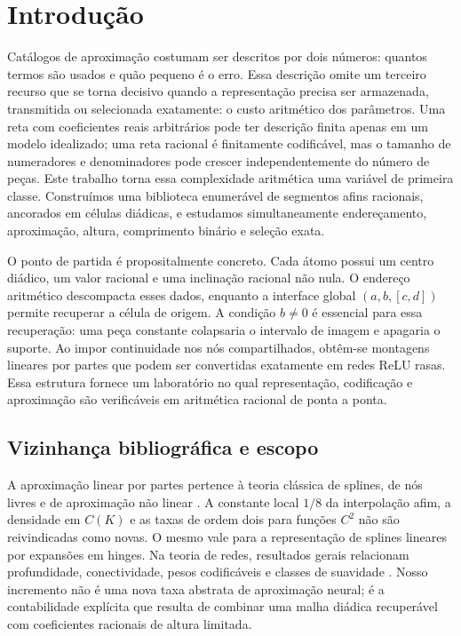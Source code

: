 \section{Introdução}
\label{sec:introduction}

Catálogos de aproximação costumam ser descritos por dois números: quantos
termos são usados e quão pequeno é o erro. Essa descrição omite um terceiro
recurso que se torna decisivo quando a representação precisa ser armazenada,
transmitida ou selecionada exatamente: o custo aritmético dos parâmetros. Uma
reta com coeficientes reais arbitrários pode ter descrição finita apenas em um
modelo idealizado; uma reta racional é finitamente codificável, mas o tamanho
de numeradores e denominadores pode crescer independentemente do número de
peças. Este trabalho torna essa complexidade aritmética uma variável de
primeira classe. Construímos uma biblioteca enumerável de segmentos afins
racionais, ancorados em células diádicas, e estudamos simultaneamente
endereçamento, aproximação, altura, comprimento binário e seleção exata.

O ponto de partida é propositalmente concreto. Cada átomo possui um centro
diádico, um valor racional e uma inclinação racional não nula. O endereço
aritmético descompacta esses dados, enquanto a interface global
$(a,b,[c,d])$ permite recuperar a célula de origem. A condição $b\ne0$ é
essencial para essa recuperação: uma peça constante colapsaria o intervalo de
imagem e apagaria o suporte. Ao impor continuidade nos nós compartilhados,
obtêm-se montagens lineares por partes que podem ser convertidas exatamente em
redes ReLU rasas. Essa estrutura fornece um laboratório no qual representação,
codificação e aproximação são verificáveis em aritmética racional de ponta a
ponta.

\subsection{Vizinhança bibliográfica e escopo}

A aproximação linear por partes pertence à teoria clássica de splines, de nós
livres e de aproximação não linear
\citep{deboor1973variable,burchard1974,deboor2001,schumaker2007,devore1998}.
A constante local $1/8$ da interpolação afim, a densidade em $C(K)$ e as taxas
de ordem dois para funções $C^2$ não são reivindicadas como novas. O mesmo vale
para a representação de splines lineares por expansões em hinges. Na teoria de
redes, resultados gerais relacionam profundidade, conectividade, pesos
codificáveis e classes de suavidade
\citep{petersenvoigtlaender2018,elbrachter2021,bolcskei2019,guhringraslan2021,
devorehaninpetrova2021}. Nosso incremento não é uma nova taxa abstrata de
aproximação neural; é a contabilidade explícita que resulta de combinar uma
malha diádica recuperável com coeficientes racionais de altura limitada.

